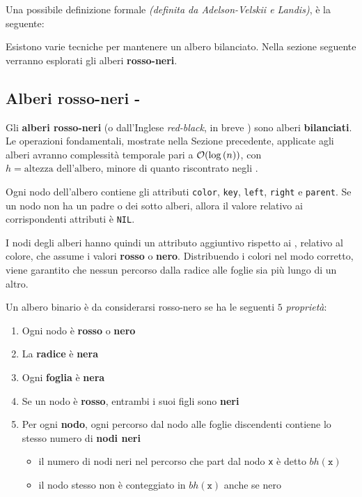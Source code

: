 \documentclass[italian, 10pt]{article}
\begin{document}
Una possibile definizione formale \textit{(definita da Adelson-Velskii e Landis)}, è la seguente:


Esistono varie tecniche per mantenere un albero bilanciato.
Nella sezione seguente verranno esplorati gli alberi \textbf{rosso-neri}.

\subsection{Alberi rosso-neri - \RB}
\label{sec:alberi-rosso-neri}

Gli \textbf{alberi rosso-neri} (o dall'Inglese \textit{red-black}, in breve \RB) sono alberi \textbf{bilanciati}.
Le operazioni fondamentali, mostrate nella Sezione precedente, applicate agli alberi \RB avranno complessità temporale pari a \(\mathcal{O}(\log{(n)})\), con \(h = \text{altezza dell'albero}\), minore di quanto riscontrato negli \BST.

Ogni nodo dell'albero contiene gli attributi \texttt{color}, \texttt{key}, \texttt{left}, \texttt{right} e \texttt{parent}.
Se un nodo non ha un padre o dei sotto alberi, allora il valore relativo ai corrispondenti attributi è \texttt{NIL}.

I nodi degli alberi \RB hanno quindi un attributo aggiuntivo rispetto ai \BST, relativo al colore, che assume i valori \textbf{rosso} o \textbf{nero}.
Distribuendo i colori nel modo corretto, viene garantito che nessun percorso dalla radice alle foglie sia più lungo di un altro.

\bigskip
Un albero binario è da considerarsi rosso-nero se ha le seguenti \(5\) \textit{proprietà}:

\begin{enumerate}[label=\arabic*., ref=(\arabic*)]
  \item \label{enum:proprieta-1-nodi-rb}Ogni nodo è \textbf{rosso} o \textbf{nero}
  \item \label{enum:proprieta-2-nodi-rb}La \textbf{radice} è \textbf{nera}
  \item \label{enum:proprieta-3-nodi-rb}Ogni \textbf{foglia} è \textbf{nera}
  \item \label{enum:proprieta-4-nodi-rb}Se un nodo è \textbf{rosso}, entrambi i suoi figli sono \textbf{neri}
  \item \label{enum:proprieta-5-nodi-rb} Per ogni \textbf{nodo}, ogni percorso dal nodo alle foglie discendenti contiene lo stesso numero di \textbf{nodi neri}
        \begin{itemize}
          \item il numero di nodi neri nel percorso che part dal nodo \texttt{x} è detto \(bh(\texttt{x})\)
          \item il nodo stesso non è conteggiato in \(bh(\texttt{x})\) anche se nero
        \end{itemize}
\end{enumerate}
\end{document}
